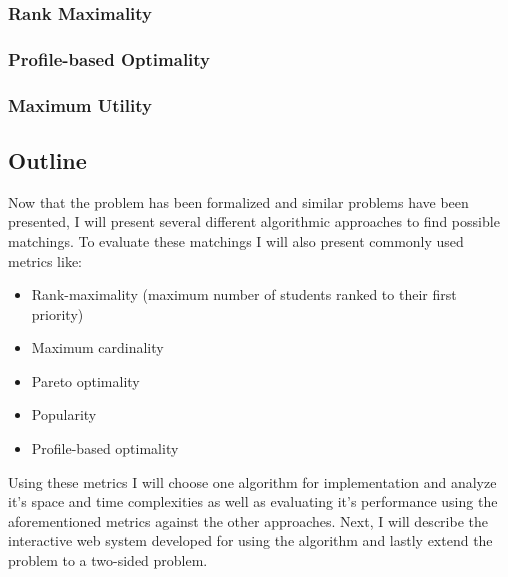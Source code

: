 \subsubsection{Rank Maximality}
\subsubsection{Profile-based Optimality}
\subsubsection{Maximum Utility}

\subsection{Outline}
Now that the problem has been formalized and similar problems have been presented, I will present several different algorithmic approaches to find possible matchings. To evaluate these matchings I will also present commonly used metrics like:
\begin{itemize}[itemsep=0pt]
    \item Rank-maximality (maximum number of students ranked to their first priority)
    \item Maximum cardinality
    \item Pareto optimality
    \item Popularity 
    \item Profile-based optimality
\end{itemize}
Using these metrics I will choose one algorithm for implementation and analyze it's space and time complexities as well as evaluating it's performance using the aforementioned metrics against the other approaches. Next, I will describe the interactive web system developed for using the algorithm and lastly extend the problem to a two-sided problem. 
